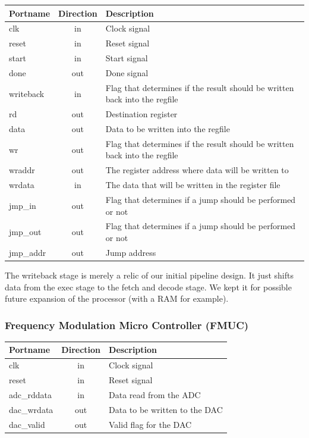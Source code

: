 \begin{center}
	\begin{tabular}{ | l | c | l | }
		\hline
		\textbf{Portname} & \textbf{Direction} & \textbf{Description} \\
		\hline
		clk & in & Clock signal \\
		reset & in  & Reset signal \\
		start & in  & Start signal \\
		done & out  & Done signal \\
		writeback & in  & Flag that determines if the result should be written back into the regfile \\
		rd & out  & Destination register \\
		data & out  & Data to be written into the regfile \\
		wr & out  & Flag that determines if the result should be written back into the regfile \\
		wraddr & out  & The register address where data will be written to \\
		wrdata & in  & The data that will be written in the register file \\
		jmp\_in & out  & Flag that determines if a jump should be performed or not  \\
		jmp\_out & out  & Flag that determines if a jump should be performed or not \\
		jmp\_addr & out  & Jump address \\
		\hline
	\end{tabular} 
\end{center}

The writeback stage is merely a relic of our initial pipeline design. It just shifts data from the exec stage to the fetch and decode stage. We kept it for possible future expansion of the processor (with a RAM for example).

\subsubsection{Frequency Modulation Micro Controller (FMUC)}

\begin{center}
	\begin{tabular}{ | l | c | l | }
		\hline
		\textbf{Portname} & \textbf{Direction} & \textbf{Description} \\
		\hline
		clk & in & Clock signal \\
		reset & in  & Reset signal \\
		adc\_rddata & in  & Data read from the ADC \\
		dac\_wrdata & out  & Data to be written to the DAC \\
		dac\_valid & out  & Valid flag for the DAC \\
		\hline
	\end{tabular} 
\end{center}

